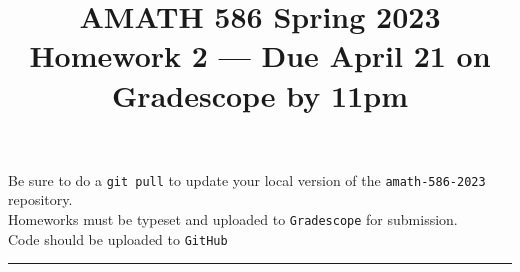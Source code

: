 \documentclass[10pt]{amsart}
\begin{document}
\pagestyle{empty}

\newcommand{\mline}{\vspace{.2in}\hrule\vspace{.2in}}


\title{\bf { AMATH 586 Spring 2023 \\ Homework 2 ---
Due April 21 on Gradescope by 11pm} }
\maketitle
\begin{center} Be sure to do a {\tt git pull} to update your local
  version of the {\tt amath-586-2023} repository.\\  Homeworks must be
  typeset and uploaded to {\tt Gradescope} for submission.\\
  Code should be uploaded to {\tt GitHub}
  \end{center}

  \mline
  
\end{document}
